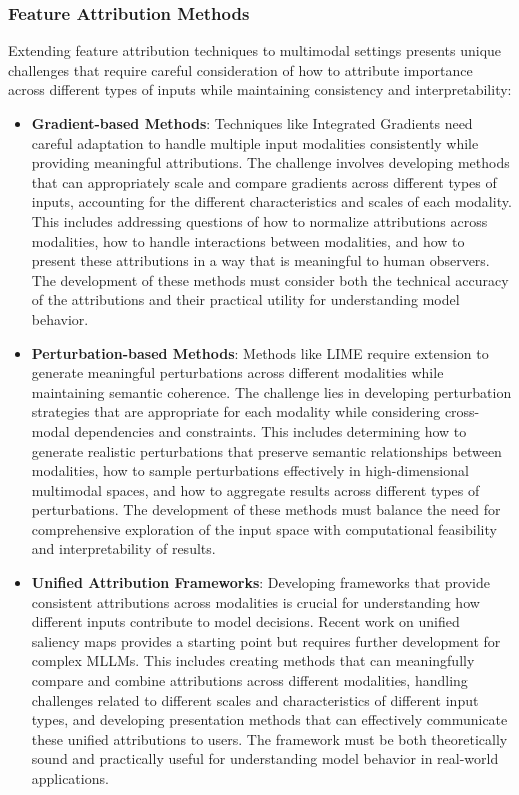 \subsubsection{Feature Attribution Methods}
Extending feature attribution techniques to multimodal settings presents unique challenges that require careful consideration of how to attribute importance across different types of inputs while maintaining consistency and interpretability:

\begin{itemize}
    \item \textbf{Gradient-based Methods}: Techniques like Integrated Gradients \citep{sundararajan2017axiomatic} need careful adaptation to handle multiple input modalities consistently while providing meaningful attributions. The challenge involves developing methods that can appropriately scale and compare gradients across different types of inputs, accounting for the different characteristics and scales of each modality. This includes addressing questions of how to normalize attributions across modalities, how to handle interactions between modalities, and how to present these attributions in a way that is meaningful to human observers. The development of these methods must consider both the technical accuracy of the attributions and their practical utility for understanding model behavior.
    
    \item \textbf{Perturbation-based Methods}: Methods like LIME \citep{ribeiro2016should} require extension to generate meaningful perturbations across different modalities while maintaining semantic coherence. The challenge lies in developing perturbation strategies that are appropriate for each modality while considering cross-modal dependencies and constraints. This includes determining how to generate realistic perturbations that preserve semantic relationships between modalities, how to sample perturbations effectively in high-dimensional multimodal spaces, and how to aggregate results across different types of perturbations. The development of these methods must balance the need for comprehensive exploration of the input space with computational feasibility and interpretability of results.
    
    \item \textbf{Unified Attribution Frameworks}: Developing frameworks that provide consistent attributions across modalities is crucial for understanding how different inputs contribute to model decisions. Recent work on unified saliency maps \citep{rebuffi2020saliency} provides a starting point but requires further development for complex MLLMs. This includes creating methods that can meaningfully compare and combine attributions across different modalities, handling challenges related to different scales and characteristics of different input types, and developing presentation methods that can effectively communicate these unified attributions to users. The framework must be both theoretically sound and practically useful for understanding model behavior in real-world applications.
\end{itemize}

